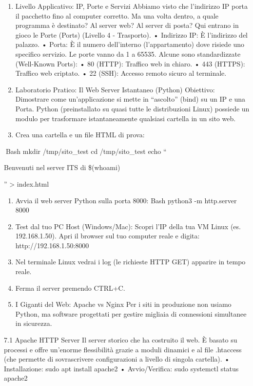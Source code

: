 \documentclass[11pt,a4paper]{article}
\begin{document}
\begin{enumerate}
\def\labelenumi{\arabic{enumi}.}
\setcounter{enumi}{4}
\item
  Livello Applicativo: IP, Porte e Servizi Abbiamo visto che l'indirizzo
  IP porta il pacchetto fino al computer corretto. Ma una volta dentro,
  a quale programma è destinato? Al server web? Al server di posta? Qui
  entrano in gioco le Porte (Ports) (Livello 4 - Trasporto). • Indirizzo
  IP: È l'indirizzo del palazzo. • Porta: È il numero dell'interno
  (l'appartamento) dove risiede uno specifico servizio. Le porte vanno
  da 1 a 65535. Alcune sono standardizzate (Well-Known Ports): • 80
  (HTTP): Traffico web in chiaro. • 443 (HTTPS): Traffico web criptato.
  • 22 (SSH): Accesso remoto sicuro al terminale.
\item
  Laboratorio Pratico: Il Web Server Istantaneo (Python) Obiettivo:
  Dimostrare come un'applicazione si mette in ``ascolto'' (bind) su un
  IP e una Porta. Python (preinstallato su quasi tutte le distribuzioni
  Linux) possiede un modulo per trasformare istantaneamente qualsiasi
  cartella in un sito web.
\item
  Crea una cartella e un file HTML di prova:
\end{enumerate}

Bash mkdir /tmp/sito\_test cd /tmp/sito\_test echo ``

Benvenuti nel server ITS di \$(whoami)

'' \textgreater{} index.html

\begin{enumerate}
\def\labelenumi{\arabic{enumi}.}
\setcounter{enumi}{1}
\item
  Avvia il web server Python sulla porta 8000: Bash python3 -m
  http.server 8000
\item
  Test dal tuo PC Host (Windows/Mac): Scopri l'IP della tua VM Linux
  (es. 192.168.1.50). Apri il browser sul tuo computer reale e digita:
  http://192.168.1.50:8000
\item
  Nel terminale Linux vedrai i log (le richieste HTTP GET) apparire in
  tempo reale.
\item
  Ferma il server premendo CTRL+C.
\item
  I Giganti del Web: Apache vs Nginx Per i siti in produzione non usiamo
  Python, ma software progettati per gestire migliaia di connessioni
  simultanee in sicurezza.
\end{enumerate}

7.1 Apache HTTP Server Il server storico che ha costruito il web. È
basato su processi e offre un'enorme flessibilità grazie a moduli
dinamici e al file .htaccess (che permette di sovrascrivere
configurazioni a livello di singola cartella). • Installazione: sudo apt
install apache2 • Avvio/Verifica: sudo systemctl status apache2
\end{document}
